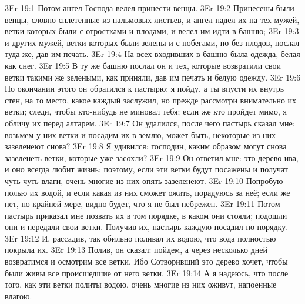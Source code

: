 \vs 3Er 19:1
Потом ангел Господа велел
принести венцы.
\vs 3Er 19:2
Принесены были венцы,
словно сплетенные из пальмовых листьев, и ангел надел их на тех мужей, ветки
которых были с отростками и плодами, и велел им идти в башню;
\vs 3Er 19:3
и других мужей, ветки
которых были зелены и с побегами, но без плодов, послал туда же, дав им
печать.
\vs 3Er 19:4
На всех входивших в башню
была одежда, белая как снег.
\vs 3Er 19:5
В ту же башню послал он и
тех, которые возвратили свои ветки такими же зелеными, как приняли, дав им
печать и белую одежду.
\vs 3Er 19:6
По окончании этого он
обратился к пастырю: я пойду, а ты впусти их внутрь стен, на то место, какое
каждый заслужил, но прежде рассмотри внимательно их ветки; следи, чтобы
кто-нибудь не миновал тебя; если же кто пройдет мимо, я обличу их перед
алтарем.
\vs 3Er 19:7
Он удалился, после чего
пастырь сказал мне: возьмем у них ветки и посадим их в землю, может быть,
некоторые из них зазеленеют снова?
\vs 3Er 19:8
Я удивился: господин,
каким образом могут снова зазеленеть ветки, которые уже засохли?
\vs 3Er 19:9
Он ответил мне: это дерево
ива, и оно всегда любит жизнь: поэтому, если эти ветки будут посажены и
получат чуть-чуть влаги, очень многие из них опять зазеленеют.
\vs 3Er 19:10
Попробую полью их водой,
и если какая из них сможет ожить, порадуюсь за неё; если же нет, по крайней
мере, видно будет, что я не был небрежен.
\vs 3Er 19:11
Потом пастырь приказал
мне позвать их в том порядке, в каком они стояли; подошли они и передали свои
ветки. Получив их, пастырь каждую посадил по порядку.
\vs 3Er 19:12
И, рассадив, так обильно
поливал их водою, что вода полностью покрыла их.
\vs 3Er 19:13
Полив, он сказал: пойдем,
а через несколько дней возвратимся и осмотрим все ветки. Ибо Сотворивший это
дерево хочет, чтобы были живы все происшедшие от него ветки.
\vs 3Er 19:14
А я надеюсь, что после
того, как эти ветки политы водою, очень многие из них оживут, напоенные
влагою.

